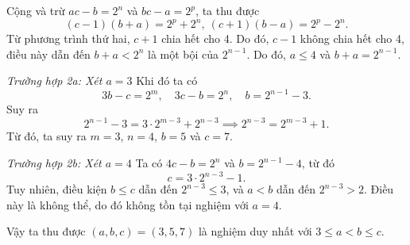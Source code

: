\documentclass[../02-modular-arithmetic-b.tex]{subfiles}
\begin{document}
\begin{soln}
	Cộng và trừ \( ac - b = 2^n \) và \( bc - a = 2^p \), ta thu được
	\[
		(c - 1)(b + a) = 2^p + 2^n,\ (c + 1)(b - a) = 2^p - 2^n.
	\]
	Từ phương trình thứ hai, \( c + 1 \) chia hết cho 4.
	Do đó, \( c - 1 \) không chia hết cho 4, điều này dẫn đến \( b + a < 2^n \) là một bội của \( 2^{n-1} \).
	Do đó, \( a \leq 4 \) và \( b + a = 2^{n-1} \).
	
	\textit{Trường hợp 2a: Xét \( a = 3 \)}
	Khi đó ta có  
	\[
		3b - c = 2^m, \quad 3c - b = 2^n, \quad b = 2^{n-1} - 3.
	\]
	Suy ra  
	\[
		2^{n-1} - 3 = 3 \cdot 2^{m-3} + 2^{n-3} \implies 2^{n-3} = 2^{m-3} + 1.
	\]
	Từ đó, ta suy ra \( m = 3 \), \( n = 4 \), \( b = 5 \) và \( c = 7 \).
	
	\textit{Trường hợp 2b: Xét \( a = 4 \)}
	Ta có \( 4c - b = 2^n \) và \( b = 2^{n-1} - 4 \), từ đó  
	\[
		c = 3 \cdot 2^{n-3} - 1.
	\]
	Tuy nhiên, điều kiện \( b \leq c \) dẫn đến \( 2^{n-3} \leq 3 \), và \( a < b \) dẫn đến \( 2^{n-3} > 2 \).
	Điều này là không thể, do đó không tồn tại nghiệm với \( a = 4 \).
	
	Vậy ta thu được \( (a,b,c) = (3,5,7) \) là nghiệm duy nhất với \( 3 \leq a < b \leq c \).
\end{soln}

\end{document}
